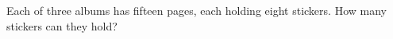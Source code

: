Each of three albums has fifteen pages, each holding eight stickers. How many stickers can they hold?
